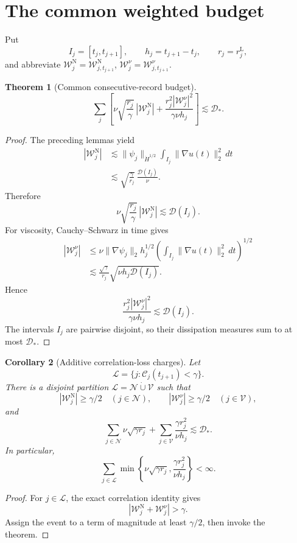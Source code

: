 \documentclass[11pt]{article}
\newtheorem{theorem}{Theorem}
\newtheorem{corollary}[theorem]{Corollary}
\theoremstyle{remark}
\newcommand{\D}{\mathcal D}
\newcommand{\WN}{\mathcal W^{\mathrm N}}
\newcommand{\WV}{\mathcal W^\nu}
\newcommand{\Cband}{\mathcal C}
\begin{document}
\section{The common weighted budget}

Put
\[
 I_j=[t_j,t_{j+1}],
 \qquad
 h_j=t_{j+1}-t_j,
 \qquad
 r_j=r_j^{\mathrm L},
\]
and abbreviate
\(\WN_j=\WN_{j,t_{j+1}}\),
\(\WV_j=\WV_{j,t_{j+1}}\).

\begin{theorem}[Common consecutive-record budget]
\[
\boxed{
 \sum_j\left[
 \nu\sqrt{\frac{r_j}{\gamma}}\,|\WN_j|
 +
 \frac{r_j^2|\WV_j|^2}{\gamma\nu h_j}
 \right]
 \lesssim
 \D_*.
}
\]
\end{theorem}

\begin{proof}
The preceding lemmas yield
\[
\begin{aligned}
 |\WN_j|
 &\lesssim
 \|\psi_j\|_{\dot H^{1/2}}
 \int_{I_j}\|\nabla u(t)\|_2^2\,dt\\
 &\lesssim
 \sqrt{\frac{\gamma}{r_j}}\,
 \frac{\D(I_j)}{\nu}.
\end{aligned}
\]
Therefore
\[
 \nu\sqrt{\frac{r_j}{\gamma}}\,|\WN_j|
 \lesssim \D(I_j).
\]
For viscosity, Cauchy--Schwarz in time gives
\[
\begin{aligned}
 |\WV_j|
 &\le
 \nu\|\nabla\psi_j\|_2
 h_j^{1/2}
 \left(\int_{I_j}\|\nabla u(t)\|_2^2\,dt\right)^{1/2}\\
 &\lesssim
 \frac{\sqrt\gamma}{r_j}
 \sqrt{\nu h_j\D(I_j)}.
\end{aligned}
\]
Hence
\[
 \frac{r_j^2|\WV_j|^2}{\gamma\nu h_j}
 \lesssim\D(I_j).
\]
The intervals \(I_j\) are pairwise disjoint, so their dissipation measures
sum to at most \(\D_*\).
\end{proof}

\begin{corollary}[Additive correlation-loss charges]
Let
\[
 \mathcal L=\{j:\Cband_j(t_{j+1})<\gamma\}.
\]
There is a disjoint partition
\(\mathcal L=\mathcal N\mathbin{\dot\cup}\mathcal V\) such that
\[
 |\WN_j|\ge\gamma/2\quad(j\in\mathcal N),
 \qquad
 |\WV_j|\ge\gamma/2\quad(j\in\mathcal V),
\]
and
\[
\boxed{
 \sum_{j\in\mathcal N}\nu\sqrt{\gamma r_j}
 +
 \sum_{j\in\mathcal V}
 \frac{\gamma r_j^2}{\nu h_j}
 \lesssim
 \D_*.
}
\]
In particular,
\[
 \sum_{j\in\mathcal L}
 \min\left\{
 \nu\sqrt{\gamma r_j},
 \frac{\gamma r_j^2}{\nu h_j}
 \right\}
 <\infty.
\]
\end{corollary}

\begin{proof}
For \(j\in\mathcal L\), the exact correlation identity gives
\[
 |\WN_j+\WV_j|>\gamma.
\]
Assign the event to a term of magnitude at least \(\gamma/2\), then invoke
the theorem.
\end{proof}
\end{document}
